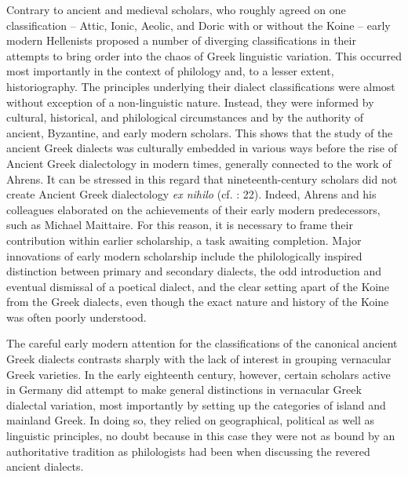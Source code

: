 Contrary to ancient and medieval scholars, who roughly agreed on one classification – Attic, Ionic, Aeolic, and Doric with or without the Koine – early modern Hellenists proposed a number of diverging classifications in their attempts to bring order into the chaos of Greek linguistic variation. This occurred most importantly in the context of philology and, to a lesser extent, historiography. The principles underlying their dialect classifications were almost without exception of a non-linguistic nature. Instead, they were informed by cultural, historical, and philological circumstances and by the authority of ancient, Byzantine, and early modern scholars. This shows that the study of the ancient Greek dialects was culturally embedded in various ways before the rise of Ancient Greek dialectology in modern times, generally connected to the work of Ahrens. It can be stressed in this regard that nineteenth-century scholars did not create Ancient Greek dialectology \textit{ex nihilo} (cf. \citealt{Colvin2007}: 22). Indeed, Ahrens and his colleagues elaborated on the achievements of their early modern predecessors, such as Michael Maittaire. For this reason, it is necessary to frame their contribution within earlier scholarship, a task awaiting completion. Major innovations of early modern scholarship include the philologically inspired distinction between primary and secondary dialects, the odd introduction and eventual dismissal of a poetical dialect, and the clear setting apart of the Koine from the Greek dialects, even though the exact nature and history of the Koine was often poorly understood.

The careful early modern attention for the classifications of the canonical ancient Greek dialects contrasts sharply with the lack of interest in grouping vernacular Greek varieties. In the early eighteenth century, however, certain scholars active in Germany did attempt to make general distinctions in vernacular Greek dialectal variation, most importantly by setting up the categories of island and mainland Greek. In doing so, they relied on geographical, political as well as linguistic principles, no doubt because in this case they were not as bound by an authoritative tradition as philologists had been when discussing the revered ancient dialects.

